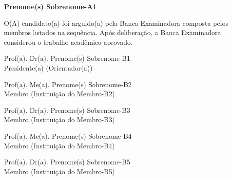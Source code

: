 \documentclass[a4paper, 12pt, twoside]{memoir}
\newenvironment*{Member}{%
  \begin{minipage}[t]{75mm}%
  \Centering\footnotesize\ignorespaces%
}{%
  \end{minipage}%
  \ignorespacesafterend%
}
\begin{document}

\vspace*{\baselineskip}

\textbf{Prenome{(s)} Sobrenome-A1}



\vspace*{2\baselineskip}

\begin{minipage}{\textwidth}
O{(A)} candidato{(a)} foi arguido{(a)} pela Banca Examinadora composta pelos membros listados na sequência.
Após deliberação, a Banca Examinadora considerou o trabalho acadêmico aprovado.
\end{minipage}

\vspace*{2\baselineskip}

\begin{Member}
Prof{(a)}. Dr{(a)}. Prenome{(s)} Sobrenome-B1\\%
Presidente{(a)} (Orientador{(a)})
\end{Member}

\vspace*{2\baselineskip}

\begin{Member}
Prof{(a)}. Me{(a)}. Prenome{(s)} Sobrenome-B2\\%
Membro (Instituição do Membro-B2)
\end{Member}%
\hfill%
\begin{Member}
Prof{(a)}. Dr{(a)}. Prenome{(s)} Sobrenome-B3\\%
Membro (Instituição do Membro-B3)
\end{Member}

\vspace*{2\baselineskip}

\begin{Member}
Prof{(a)}. Me{(a)}. Prenome{(s)} Sobrenome-B4\\%
Membro (Instituição do Membro-B4)
\end{Member}%
\hfill%
\begin{Member}
Prof{(a)}. Dr{(a)}. Prenome{(s)} Sobrenome-B5\\%
Membro (Instituição do Membro-B5)
\end{Member}
\end{document}
